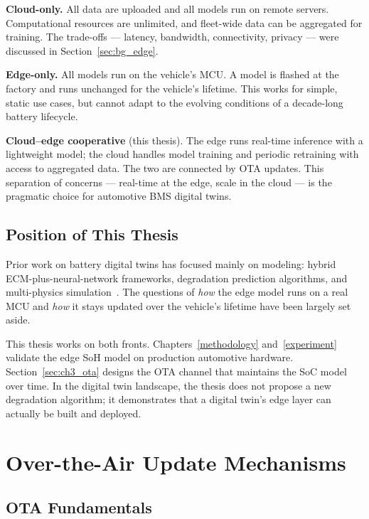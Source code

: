 \textbf{Cloud-only.} All data are uploaded and all models run on remote servers. Computational resources are unlimited, and fleet-wide data can be aggregated for training. The trade-offs --- latency, bandwidth, connectivity, privacy --- were discussed in Section~\ref{sec:bg_edge}.

\textbf{Edge-only.} All models run on the vehicle's MCU. A model is flashed at the factory and runs unchanged for the vehicle's lifetime. This works for simple, static use cases, but cannot adapt to the evolving conditions of a decade-long battery lifecycle.

\textbf{Cloud--edge cooperative} (this thesis). The edge runs real-time inference with a lightweight model; the cloud handles model training and periodic retraining with access to aggregated data. The two are connected by OTA updates. This separation of concerns --- real-time at the edge, scale in the cloud --- is the pragmatic choice for automotive BMS digital twins.

\subsection{Position of This Thesis}

Prior work on battery digital twins has focused mainly on modeling: hybrid ECM-plus-neural-network frameworks, degradation prediction algorithms, and multi-physics simulation~\autocite{tao2019,yang2020chain,alamin2023sox}. The questions of \emph{how} the edge model runs on a real MCU and \emph{how} it stays updated over the vehicle's lifetime have been largely set aside.

This thesis works on both fronts. Chapters~\ref{methodology} and~\ref{experiment} validate the edge SoH model on production automotive hardware. Section~\ref{sec:ch3_ota} designs the OTA channel that maintains the SoC model over time. In the digital twin landscape, the thesis does not propose a new degradation algorithm; it demonstrates that a digital twin's edge layer can actually be built and deployed.


\section{Over-the-Air Update Mechanisms}
\label{sec:bg_ota}

\subsection{OTA Fundamentals}

